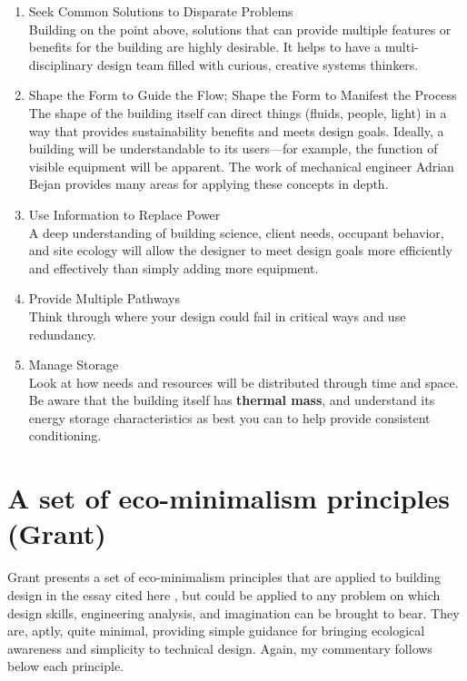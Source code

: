 \documentclass[10pt]{article}
\begin{document}
\begin{enumerate}
      \item Seek Common Solutions to Disparate Problems\\ Building on the point above, solutions that can provide multiple features or benefits for the building are highly desirable. It helps to have a multi-disciplinary design team filled with curious, creative systems thinkers.
      \item Shape the Form to Guide the Flow; Shape the Form to Manifest the Process\\ The shape of the building itself can direct things (fluids, people, light) in a way that provides sustainability benefits and meets design goals. Ideally, a building will be understandable to its users---for example, the function of visible equipment will be apparent. The work of mechanical engineer Adrian Bejan \cite{Bejan2013-jz} provides many areas for applying these concepts in depth.
      \item Use Information to Replace Power\\ A deep understanding of building science, client needs, occupant behavior, and site ecology will allow the designer to meet design goals more efficiently and effectively than simply adding more equipment.
      \item Provide Multiple Pathways\\ Think through where your design could fail in critical ways and use redundancy.
      \item Manage Storage\\ Look at how needs and resources will be distributed through time and space. Be aware that the building itself has \textbf{thermal mass}, and understand its energy storage characteristics as best you can to help provide consistent conditioning.
\end{enumerate}

\section{A set of eco-minimalism principles (Grant)}

{}

\medskip


Grant presents a set of eco-minimalism principles that are applied to building design in the essay cited here \cite{Grant2007-yc}, but could be applied to any problem on which design skills, engineering analysis, and imagination can be brought to bear. They are, aptly, quite minimal, providing simple guidance for bringing {\color{blue}ecological awareness and simplicity} to technical design. Again, my commentary follows below each principle.
\end{document}
